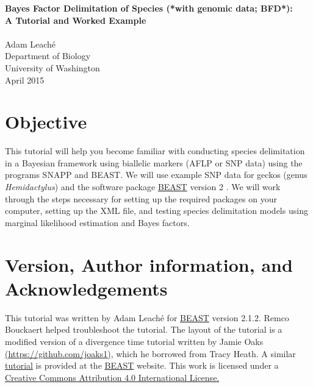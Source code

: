 \documentclass{article}
\newcommand{\program}[1]{#1\xspace}
\newcommand{\beast}{\href{http://beast2.org}{\program{BEAST}}\xspace}
\begin{document}
{\Large\bf Bayes Factor Delimitation of Species (*with genomic data; BFD*):\\
A Tutorial and Worked Example}\\
\\
Adam Leach\'e\\
Department of Biology\\
University of Washington\\
April 2015
{\singlespacing \tableofcontents}
\newpage

\section{Objective}
This tutorial will help you become familiar with conducting species delimitation in a Bayesian framework using biallelic markers (AFLP or SNP data) using the programs \program{SNAPP} and \program{BEAST}.
We will use example SNP data for geckos (genus \textit{Hemidactylus}) and the software package \beast version 2 \citep{bouckaert14}.
We will work through the steps necessary for setting up the required packages on your computer, setting up the XML file, and testing species delimitation models using marginal likelihood estimation and Bayes factors.  

\section{Version, Author information, and Acknowledgements}
This tutorial was written by Adam Leach\'e for \beast version 2.1.2. Remco Bouckaert helped troubleshoot the tutorial.
The layout of the tutorial is a modified version of a divergence time tutorial written by Jamie Oaks \href{https://github.com/joaks1}{\url{(https://github.com/joaks1)}}, which he borrowed from Tracy Heath. 
A similar \href{http://www.beast2.org/wiki/index.php/BFD*}{tutorial} is provided at the \beast website. This work is licensed under a \href{http://creativecommons.org/licenses/by/4.0/deed.en_US}{Creative Commons Attribution 4.0 International License.}
\end{document}
